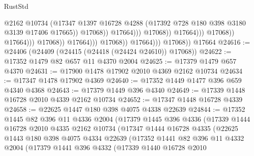 \begin{lexlean}{RustStd}
\begin{coremodule}
                                                          @2162
                                                          @10734
                                                          (@17347
                                                            @1397
                                                            @16728
                                                            @4288
                                                            (@17392
                                                              @728
                                                              @180
                                                              @398
                                                              @3180
                                                              @3139
                                                              @17406
                                                              @17665))
                                                          @17068))
                                                      @17664)))
                                                @17068))
                                            @17664)))
                                      @17068))
                                  @17664)))
                            @17068))
                        @17664)))
                  @17068))
              @17664)))
        @17068))
    @17664
@24616 := @24406 (@24409 (@24415 (@24418 (@24424 @24610)) @17068))
@24622 := @17352 @1479 @82 @657 @11 @4370 @2004
@24625 := @17379 @1479 @657 @4370
@24631 := @17900 @1478 @17902 @2010 @4369 @2162 @10734
@24634 := @17347 @1478 @17902 @4369
@24640 := @17352 @1449 @1477 @396 @659 @4340 @4368
@24643 := @17379 @1449 @396 @4340
@24649 := @17339 @1448 @16728 @2010 @4339 @2162 @10734
@24652 := @17347 @1448 @16728 @4339
@24658 := @22625 @1447 @180 @398 @4075 @4338 @22639
@24844 := @17352
    @1445
    @82
    @396
    @11
    @4336
    @2004
    (@17379
      @1445
      @396
      @4336
      (@17339
        @1444
        @16728
        @2010
        @4335
        @2162
        @10734
        (@17347
          @1444
          @16728
          @4335
          (@22625
            @1443
            @180
            @398
            @4075
            @4334
            @22639
            (@17352
              @1441
              @82
              @396
              @11
              @4332
              @2004
              (@17379
                @1441
                @396
                @4332
                (@17339
                  @1440
                  @16728
                  @2010

\end{coremodule}
\end{lexlean}
